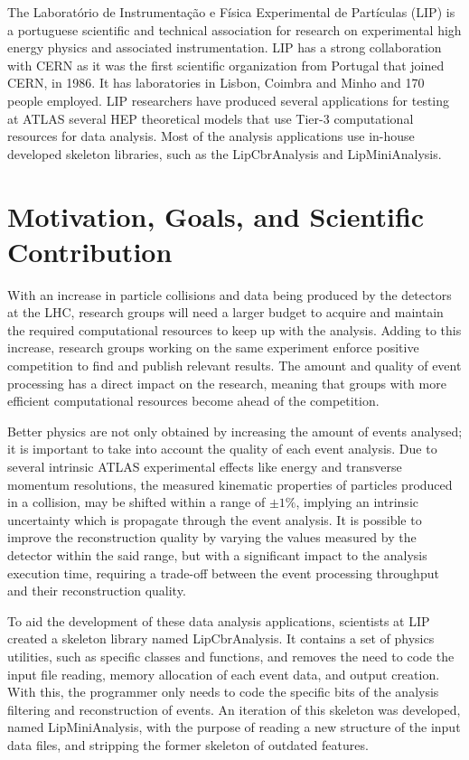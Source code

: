 The Laboratório de Instrumentação e Física Experimental de Partículas (LIP) \cite{LIP} is a portuguese scientific and technical association for research on experimental high energy physics and associated instrumentation. LIP has a strong collaboration with CERN as it was the first scientific organization from Portugal that joined CERN, in 1986. It has laboratories in Lisbon, Coimbra and Minho and 170 people employed. LIP researchers have produced several applications for testing at ATLAS several HEP theoretical models that use Tier-3 computational resources for data analysis. Most of the analysis applications use in-house developed skeleton libraries, such as the LipCbrAnalysis and LipMiniAnalysis.

\section{Motivation, Goals, and Scientific Contribution}
\label{motivation}

With an increase in particle collisions and data being produced by the detectors at the LHC, research groups will need a larger budget to acquire and maintain the required computational resources to keep up with the analysis. Adding to this increase, research groups working on the same experiment enforce positive competition to find and publish relevant results. The amount and quality of event processing has a direct impact on the research, meaning that groups with more efficient computational resources become ahead of the competition.

Better physics are not only obtained by increasing the amount of events analysed; it is important to take into account the quality of each event analysis. Due to several intrinsic ATLAS experimental effects like energy and transverse momentum resolutions, the measured kinematic properties of particles produced in a collision, may be shifted within a range of $\pm1\%$, implying an intrinsic uncertainty which is propagate through the event analysis. It is possible to improve the reconstruction quality by varying the values measured by the detector within the said range, but with a significant impact to the analysis execution time, requiring a trade-off between the event processing throughput and their reconstruction quality.

To aid the development of these data analysis applications, scientists at LIP created a skeleton library named LipCbrAnalysis. It contains a set of physics utilities, such as specific classes and functions, and removes the need to code the input file reading, memory allocation of each event data, and output creation. With this, the programmer only needs to code the specific bits of the analysis filtering and reconstruction of events. An iteration of this skeleton was developed, named LipMiniAnalysis, with the purpose of reading a new structure of the input data files, and stripping the former skeleton of outdated features.

